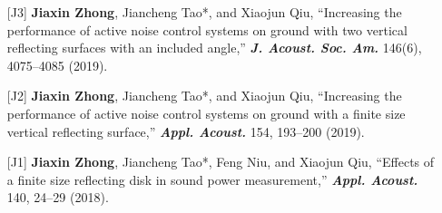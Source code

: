 \documentclass[10pt,a4paper,ragged2e,withhyper]{altacv}
\newcommand{\PubJournal}[1]{\textbf{\textit{#1}}}
\newcommand{\PubTitle}[1]{``{#1,}''}
\newcommand{\PubCorAuthor}[1]{#1*}
\begin{document}
\begin{itemize}[leftmargin = 30pt]
    \item[{[J3]}] \textbf{Jiaxin Zhong}, \PubCorAuthor{Jiancheng Tao}, and Xiaojun Qiu,
    \PubTitle{Increasing the performance of active noise control systems on ground with two vertical reflecting surfaces with an included angle}
    \PubJournal{J. Acoust. Soc. Am.}
    146(6), 4075--4085 (2019).
    \href{https://doi.org/10.1121/1.5134062}{\color{accent}\aiDoi}
    \href{https://github.com/JiaxinZhong/JiaxinZhong.github.io/raw/master/publications/journal/Zhong2019-JASA-ANC_surface_included_angle.pdf}{\color{accent}\faFilePdf[regular]}

    \item[{[J2]}] \textbf{Jiaxin Zhong}, \PubCorAuthor{Jiancheng Tao}, and Xiaojun Qiu,
    \PubTitle{Increasing the performance of active noise control systems on ground with a finite size vertical reflecting surface}
    \PubJournal{Appl. Acoust.}
    154, 193--200 (2019).
    \href{https://doi.org/10.1016/j.apacoust.2019.05.002}{\color{accent}\aiDoi}
    \href{https://github.com/JiaxinZhong/JiaxinZhong.github.io/raw/master/publications/journal/Zhong2019-AA-ANC_finite_size_surface.pdf}{\color{accent}\faFilePdf[regular]}

    \item[{[J1]}] \textbf{Jiaxin Zhong}, \PubCorAuthor{Jiancheng Tao}, Feng Niu, and Xiaojun Qiu,
    \PubTitle{Effects of a finite size reflecting disk in sound power measurement}
    \PubJournal{Appl. Acoust.}
    140, 24--29 (2018).
    \href{https://doi.org/10.1016/j.apacoust.2018.05.007}{\color{accent}\aiDoi}
    \href{https://github.com/JiaxinZhong/JiaxinZhong.github.io/raw/master/publications/journal/Zhong2018-AA-Sound_power.pdf}{\color{accent}\faFilePdf[regular]}
\end{itemize}


\divider

{}
\end{document}
